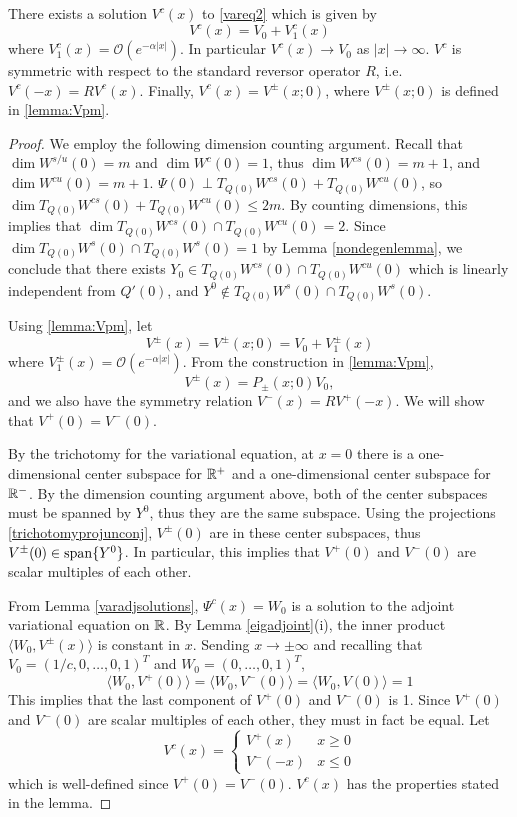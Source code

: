 \documentclass[thesis.tex]{subfiles}
\begin{document}
\begin{lemma}\label{lemma:Vcexists}
There exists a solution $V^c(x)$ to \eqref{vareq2} which is given by
\[
V^c(x) = V_0 + V^c_1(x)
\]
where $V^c_1(x) = \mathcal{O}(e^{-\alpha |x|})$. In particular $V^c(x) \rightarrow V_0$ as $|x| \rightarrow \infty$. $V^c$ is symmetric with respect to the standard reversor operator $R$, i.e. $V^c(-x) = R V^c(x)$. Finally, $V^c(x) = V^\pm(x; 0)$, where $V^\pm(x; 0)$ is defined in \cref{lemma:Vpm}. 

\begin{proof}
We employ the following dimension counting argument. Recall that $\dim W^{s/u}(0) = m$ and $\dim W^c(0) = 1$, thus $\dim W^{cs}(0) = m + 1$, and $\dim W^{cu}(0) = m + 1$. $\Psi(0) \perp T_{Q(0)}W^{cs}(0) + T_{Q(0)}W^{cu}(0)$, so $\dim T_{Q(0)}W^{cs}(0) + T_{Q(0)}W^{cu}(0) \leq 2m$. By counting dimensions, this implies that $\dim T_{Q(0)}W^{cs}(0) \cap T_{Q(0)}W^{cu}(0) = 2$. Since $\dim T_{Q(0)}W^s(0) \cap T_{Q(0)}W^s(0) = 1$ by Lemma \ref{nondegenlemma}, we conclude that there exists $Y_0 \in T_{Q(0)}W^{cs}(0) \cap T_{Q(0)}W^{cu}(0)$ which is linearly independent from $Q'(0)$, and $Y^0 \notin T_{Q(0)}W^s(0) \cap T_{Q(0)}W^s(0)$.

Using \cref{lemma:Vpm}, let
\[
V^\pm(x) = V^\pm(x; 0) = V_0 + V_1^\pm(x)
\]
where $V_1^\pm(x) = \mathcal{O}(e^{-\alpha |x|})$. From the construction in \cref{lemma:Vpm},
\[
V^\pm(x) = P_\pm(x; 0) V_0,
\]
and we also have the symmetry relation $V^-(x) = R V^+(-x)$. We will show that $V^+(0) = V^-(0)$.

By the trichotomy for the variational equation, at $x = 0$ there is a one-dimensional center subspace for $\mathbb{R}^+$ and a one-dimensional center subspace for $\mathbb{R}^-$. By the dimension counting argument above, both of the center subspaces must be spanned by $Y^0$, thus they are the same subspace. Using the projections \eqref{trichotomyprojunconj}, $V^\pm(0)$ are in these center subspaces, thus $V^\pm(0) \in \mathop\mathrm{span}\nolimits \{Y^0 \}$. In particular, this implies that $V^+(0)$ and $V^-(0)$ are scalar multiples of each other. 

From Lemma \ref{varadjsolutions}, $\Psi^c(x) = W_0$ is a solution to the adjoint variational equation on $\mathbb{R}$. By Lemma \ref{eigadjoint}(i), the inner product $\langle W_0, V^\pm(x) \rangle$ is constant in $x$. Sending $x \rightarrow \pm \infty$ and recalling that $V_0 = (1/c, 0, \dots, 0, 1)^T $ and $W_0 = (0, \dots, 0, 1)^T$,
\[
\langle W_0, V^+(0) \rangle = \langle W_0, V^-(0) \rangle
= \langle W_0, V(0) \rangle = 1
\]
This implies that the last component of $V^+(0)$ and $V^-(0)$ is 1. Since $V^+(0)$ and $V^-(0)$ are scalar multiples of each other, they must in fact be equal. Let
\[
V^c(x) = \begin{cases}
V^+(x) & x \geq 0 \\
V^-(-x) & x \leq 0 
\end{cases}
\]
which is well-defined since $V^+(0) = V^-(0)$. $V^c(x)$ has the properties stated in the lemma.
\end{proof}
\end{lemma}
\end{document}
